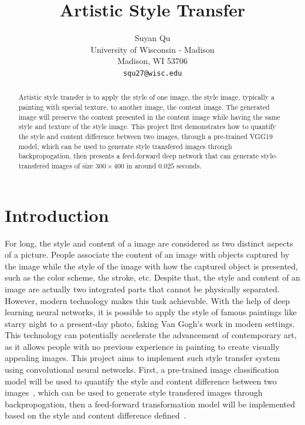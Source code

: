 \documentclass[10pt,twocolumn,letterpaper]{article}
\begin{document}
\title{Artistic Style Transfer}

\author{Suyan Qu\\
University of Wisconsin - Madison\\
Madison, WI 53706\\
{\tt\small squ27@wisc.edu}
}

\maketitle

\begin{abstract}
   Artistic style transfer is to apply the style of one image, the style image, typically a painting with special texture, to another image, the content image. The generated image will preserve the content presented in the content image while having the same style and texture of the style image. This project first demonstrates how to quantify the style and content difference between two images, through a pre-trained VGG19 model, which can be used to generate style transfered images through backpropogation, then presents a feed-forward deep network that can generate style-transfered images of size $300\times400$ in around $0.025$ seconds. 
\end{abstract}

\section{Introduction}
For long, the style and content of a image are considered as two distinct aspects of a picture. People associate the content of an image with objects captured by the image while the style of the image with how the captured object is presented, such as the color scheme, the stroke, etc. Despite that, the style and content of an image are actually two integrated parts that cannot be physically separated. However, modern technology makes this task achievable. With the help of deep learning neural networks, it is possible to apply the style of famous paintings like starry night to a present-day photo, faking Van Gogh’s work in modern settings.
This technology can potentially accelerate the advancement of contemporary art, as it allows people with no previous experience in painting to create visually appealing images. This project aims to implement such style transfer system using convolutional neural networks. First, a pre-trained image classification model will be used to quantify the style and content difference between two images~\cite{Gatys}, which can be used to generate style transfered images through backpropogation, then a feed-forward transformation model will be implemented based on the style and content difference defined~\cite{Johnson}. 
\end{document}
